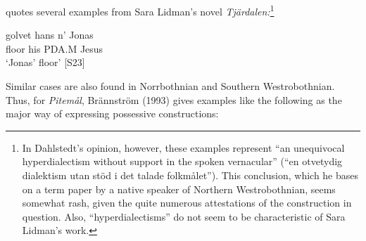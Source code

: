{{%
\citet[51]{Dahlstedt1971} quotes several examples from Sara Lidman’s novel \textit{Tjärdalen}\textit{:}\footnote{ In Dahlstedt’s opinion, however, these examples represent “an unequivocal hyperdialectism without support in the spoken vernacular” (“en otvetydig dialektism utan stöd i det talade folkmålet”). This conclusion, which he bases on a term paper by a native speaker of Northern Westrobothnian, seems somewhat rash, given the quite numerous attestations of the construction in question. Also, “hyperdialectisms” do not seem to be characteristic of Sara Lidman’s work.\par }


\item 


\item 


\ea\label{}
\gll golvet  hans  n’  Jonas\\
floor  his  PDA.M  Jesus\\
\glt  ‘Jonas’ floor’ [S23]
}


\z 
\z

Similar cases are also found in Norrbothnian and Southern Westrobothnian. Thus, for \textit{Pitemål}, Brännström (1993) gives examples like the following as the major way of expressing possessive constructions:


\ea\label{}

}
